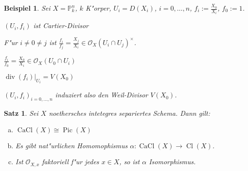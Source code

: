 \documentclass[paper = A4, fontsize=12pt, numbers=noendperiod, chapterprefix=true]{scrbook}
\theoremstyle{break}
\newtheorem{Satz}{Satz}
\theoremstyle{nonumberbreak}
\newtheorem{bsp}{Beispiel}
\theoremstyle{nonumberplain}
\newcommand{\quot}[1]{\textrm{\glqq}{#1}\textrm{\grqq}}
\DeclareMathOperator{\CaCl}{CaCl}
\DeclareMathOperator{\Cl}{Cl}
\DeclareMathOperator{\Pic}{Pic}
\DeclareMathOperator{\ddiv}{div}
\newcommand{\IP}{\mathbb{P}}%
\newcommand{\calO}{\mathcal{O}}
\newcommand{\X}{\times}
\begin{document}
\begin{bsp}
Sei $X = \IP_k^n$, $k$ K"orper, $U_i = D(X_i)$, $i = 0,\ldots ,n$, $f_i := \frac{X_0}{X_i}$, $f_0 := 1$.
\begin{description}[\setlabelstyle{\normalfont}]
\item[\textbf{Behauptung:}]
	$(U_i, f_i)$ ist Cartier-Divisor
\item[\itshape{Denn:}]
	F"ur $i \ne 0 \ne j$ ist $\frac{f_i}{f_j} = \frac{X_j}{X_i} \in \calO_X(U_i \cap U_j)^\X$.
	
	$\frac{f_i}{f_0} = \frac{X_0}{X_i} \in \calO_X(U_0 \cap U_i)$
	
	$\ddiv(f_i)|_{U_i} = V(X_0)$
	
	$(U_i, f_i)_{i=0,\ldots ,n}$ \quot{induziert} also den Weil-Divisor $V(X_0)$.
\end{description}\end{bsp}

\begin{Satz}
Sei $X$ noethersches intetegres separiertes Schema. Dann gilt:
\begin{enumerate}[a)]
\item
	$\CaCl(X) \cong \Pic(X)$
\item
	Es gibt nat"urlichen Homomophismus $\alpha: \CaCl(X) \to \Cl(X)$.
\item
	Ist $\calO_{X,x}$ faktoriell f"ur jedes $x \in X$, so ist $\alpha$ Isomorphismus.
\end{enumerate}\end{Satz}
\end{document}

